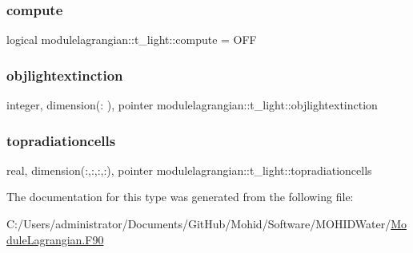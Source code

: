 \subsubsection{\texorpdfstring{compute}{compute}}
{\footnotesize\ttfamily logical modulelagrangian\+::t\+\_\+light\+::compute = O\+FF\hspace{0.3cm}{\ttfamily [private]}}

\mbox{\label{structmodulelagrangian_1_1t__light_ae9db5923c4cc4c9edd02c42c14ccc78d}} 
\subsubsection{\texorpdfstring{objlightextinction}{objlightextinction}}
{\footnotesize\ttfamily integer, dimension(\+:      ), pointer modulelagrangian\+::t\+\_\+light\+::objlightextinction\hspace{0.3cm}{\ttfamily [private]}}

\mbox{\label{structmodulelagrangian_1_1t__light_a114df72540e411ee85fa831276a7a35b}} 
\subsubsection{\texorpdfstring{topradiationcells}{topradiationcells}}
{\footnotesize\ttfamily real, dimension(\+:,\+:,\+:,\+:), pointer modulelagrangian\+::t\+\_\+light\+::topradiationcells\hspace{0.3cm}{\ttfamily [private]}}



The documentation for this type was generated from the following file\+:\begin{DoxyCompactItemize}
\item 
C\+:/\+Users/administrator/\+Documents/\+Git\+Hub/\+Mohid/\+Software/\+M\+O\+H\+I\+D\+Water/\mbox{\hyperlink{_module_lagrangian_8_f90}{Module\+Lagrangian.\+F90}}\end{DoxyCompactItemize}
